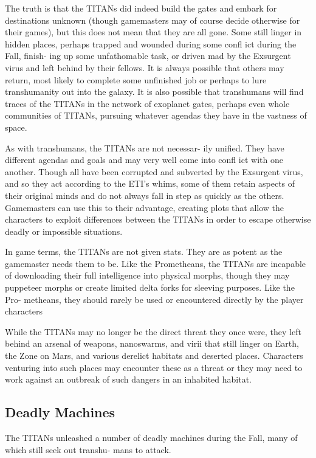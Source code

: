 The truth is that the TITANs did indeed build the 
gates and embark for destinations unknown (though 
gamemasters may of course decide otherwise for their 
games), but this does not mean that they are all gone. 
Some still linger in hidden places, perhaps trapped and 
wounded during some confl ict during the Fall, finish-
ing up some unfathomable task, or driven mad by the 
Exsurgent virus and left behind by their fellows. It is 
always possible that others may return, most likely 
to complete some unfinished job or perhaps to lure 
transhumanity out into the galaxy. It is also possible 
that transhumans will find traces of the TITANs in 
the network of exoplanet gates, perhaps even whole 
communities of TITANs, pursuing whatever agendas 
they have in the vastness of space.

As with transhumans, the TITANs are not necessar-
ily unified. They have different agendas and goals and 
may very well come into confl ict with one another. 
Though all have been corrupted and subverted by the 
Exsurgent virus, and so they act according to the ETI's 
whims, some of them retain aspects of their original 
minds and do not always fall in step as quickly as the 
others. Gamemasters can use this to their advantage, 
creating plots that allow the characters to exploit 
differences between the TITANs in order to escape 
otherwise deadly or impossible situations.

In game terms, the TITANs are not given stats. 
They are as potent as the gamemaster needs them to 
be. Like the Prometheans, the TITANs are incapable 
of downloading their full intelligence into physical 
morphs, though they may puppeteer morphs or create 
limited delta forks for sleeving purposes. Like the Pro-
metheans, they should rarely be used or encountered 
directly by the player characters

While the TITANs may no longer be the direct 
threat they once were, they left behind an arsenal of 
weapons, nanoswarms, and virii that still linger on 
Earth, the Zone on Mars, and various derelict habitats 
and deserted places. Characters venturing into such 
places may encounter these as a threat or they may 
need to work against an outbreak of such dangers in 
an inhabited habitat.

\subsection{Deadly Machines}

The TITANs unleashed a number of deadly machines 
during the Fall, many of which still seek out transhu-
mans to attack.

